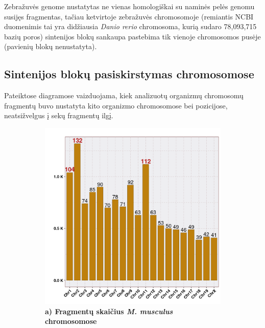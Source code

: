 \documentclass[12pt]{article}
\begin{document}
Zebražuvės genome nustatytas ne vienas homologiškai su naminės pelės genomu
susijęs fragmentas, tačiau ketvirtoje zebražuvės chromosomoje (remiantis
NCBI\cite{NCBI} duomenimis tai yra didžiausia \emph{Danio rerio} chromosoma,
kurią sudaro 78,093,715 bazių poros) sintenijos blokų sankaupa pastebima
tik vienoje chromosomos pusėje (pavienių blokų nenustatyta).

\subsection{Sintenijos blokų pasiskirstymas chromosomose}
Pateiktose diagramose vaizduojama, kiek analizuotų organizmų chromosomų
fragmentų buvo nustatyta kito organizmo chromosomose bei pozicijose,
neatsižvelgus į sekų fragmentų ilgį.

\begin{figure}[htb]
    \centering
    \begin{subfigure}[b]{0.45\textwidth}
        \centering
        \includegraphics[width=\textwidth]{../Figures/Synteny_Chr_MM.png}
        \caption*{\centering\small\textbf{a) Fragmentų skaičius
                                          \emph{M. musculus} chromosomose}}
    \end{subfigure}
    \hfill
    \begin{subfigure}[b]{0.45\textwidth}
        \centering

\end{subfigure}
\end{figure}
\end{document}
